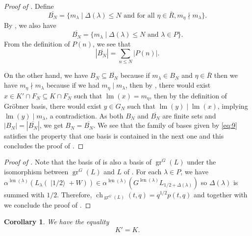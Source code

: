 \documentclass[a4paper, 12pt, reqno]{amsart}
\newtheorem{corollary}[theorem]{Corollary}
\theoremstyle{remark}
\DeclareMathOperator{\gr}{gr}
\DeclareMathOperator{\ch}{ch}
\DeclareMathOperator{\lm}{lm}
\DeclareMathOperator{\len}{len}
\DeclareMathOperator{\vachalf}{|1/2\rangle}
\begin{document}
\begin{proof}[Proof of ]
  Define
  \begin{equation*}
    \overline{B_N} = \{m_\lambda \mid \Delta(\lambda) \le N\text{ and for all }\eta \in \overline{R}, m_\eta \nmid m_\lambda\}.
  \end{equation*}
  By , we also have
  \begin{equation*}
    \overline{B_N} = \{m_\lambda \mid \Delta(\lambda) \le N\text{ and }\lambda \in P\}.
  \end{equation*}
  From the definition of $P(n)$, we see that
  \begin{equation*}
    |\overline{B_N}| = \sum_{n \le N}|P(n)|.
  \end{equation*}
  
  On the other hand, we have $B_N \subseteq \overline{B_N}$ because if $m_\lambda \in B_N$ and $\eta \in \overline{R}$ then we have $m_\eta \nmid m_\lambda$ because if we had $m_\eta \mid m_\lambda$, then by , there would exist $x \in K' \cap F_N \subseteq K \cap F_N$ such that $\lm(x) = m_\eta$, then by the definition of Gr\"{o}bner basis, there would exist $y \in G_N$ such that $\lm(y) \mid \lm(x)$, implying $\lm(y) \mid m_\lambda$, a contradiction.
  As both $B_N$ and $\overline{B_N}$ are finite sets and $|B_N| = |\overline{B_N}|$, we get $B_N = \overline{B_N}$.
  We see that the family of bases given by \eqref{eq:9} satisfies the property that one basis is contained in the next one and this concludes the proof of .
\end{proof}

\begin{proof}[Proof of ]
  Note that the basis of  is also a basis of $\gr^G(L)$ under the isomorphism between $\gr^G(L)$ and $L$ of .
  For each $\lambda \in P$, we have $\alpha^{\len(\lambda)}(L_\lambda(\vachalf + W)) \in \alpha^{\len(\lambda)}(G^{\len(\lambda)}L_{1/2 + \Delta(\lambda)})$ so $\Delta(\lambda)$ is summed with $1/2$.
  Therefore, $\ch_{\gr^G(L)}(t, q) = q^{1/2}p(t, q)$ and together with  we conclude the proof of .
\end{proof}

\begin{corollary}
  \label{crl:1}
  We have the equality
  \begin{equation*}
    K' = K.
  \end{equation*}
\end{corollary}
\end{document}
